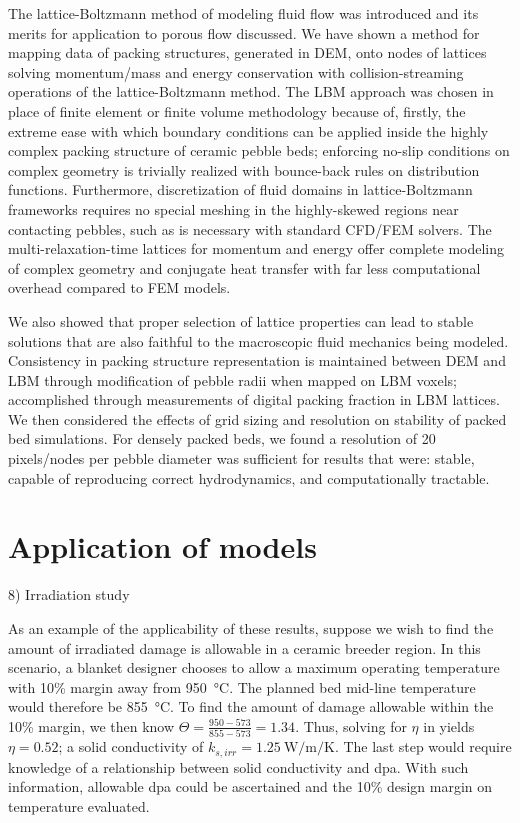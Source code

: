 The lattice-Boltzmann method of modeling fluid flow was introduced and its merits for application to porous flow discussed. We have shown a method for mapping data of packing structures, generated in DEM, onto nodes of lattices solving momentum/mass and energy conservation with collision-streaming operations of the lattice-Boltzmann method. The LBM approach was chosen in place of finite element or finite volume methodology because of, firstly, the extreme ease with which boundary conditions can be applied inside the highly complex packing structure of ceramic pebble beds; enforcing no-slip conditions on complex geometry is trivially realized with bounce-back rules on distribution functions. Furthermore, discretization of fluid domains in lattice-Boltzmann frameworks requires no special meshing in the highly-skewed regions near contacting pebbles, such as is necessary with standard CFD/FEM solvers. The multi-relaxation-time lattices for momentum and energy offer complete modeling of complex geometry and conjugate heat transfer with far less computational overhead compared to FEM models.

We also showed that proper selection of lattice properties can lead to stable solutions that are also faithful to the macroscopic fluid mechanics being modeled. Consistency in packing structure representation is maintained between DEM and LBM through modification of pebble radii when mapped on LBM voxels; accomplished through measurements of digital packing fraction in LBM lattices. We then considered the effects of grid sizing and resolution on stability of packed bed simulations. For densely packed beds, we found a resolution of 20 pixels/nodes per pebble diameter was sufficient for results that were: stable, capable of reproducing correct hydrodynamics, and computationally tractable.

\section{Application of models}
8) Irradiation study

As an example of the applicability of these results, suppose we wish to find the amount of irradiated damage is allowable in a ceramic breeder region. In this scenario, a blanket designer chooses to allow a maximum operating temperature with 10\% margin away from \SI{950}{\celsius}. The planned bed mid-line temperature would therefore be \SI{855}{\celsius}. To find the amount of damage allowable within the 10\% margin, we then know $\Theta = \frac{950-573}{855-573} = 1.34$. Thus, solving for $\eta$ in  yields $\eta = 0.52$; a solid conductivity of $k_{s,irr} = \SI{1.25}{\watt\per\meter\per\kelvin}$. The last step would require knowledge of a relationship between solid conductivity and dpa. With such information, allowable dpa could be ascertained and the 10\% design margin on temperature evaluated.

